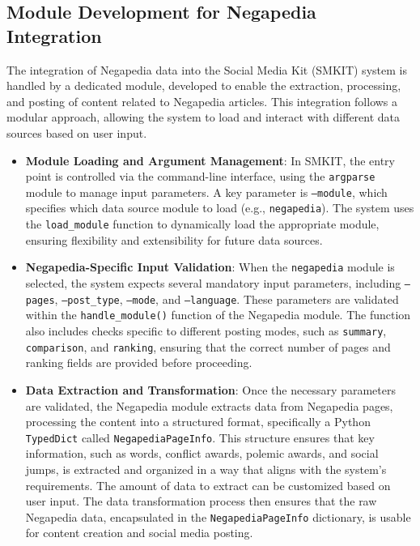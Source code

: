 \subsection{Module Development for Negapedia Integration}
\label{subsec:module_development_for_negapedia_integration}
The integration of Negapedia data into the Social Media Kit (SMKIT) system is handled by a dedicated module, developed to enable the extraction, processing, and posting of content related to Negapedia articles. This integration follows a modular approach, allowing the system to load and interact with different data sources based on user input.

\begin{itemize}
    \item \textbf{Module Loading and Argument Management}: In SMKIT, the entry point is controlled via the command-line interface, using the \texttt{argparse} module to manage input parameters. A key parameter is \texttt{--module}, which specifies which data source module to load (e.g., \texttt{negapedia}). The system uses the \texttt{load\_module} function to dynamically load the appropriate module, ensuring flexibility and extensibility for future data sources.
    
    \item \textbf{Negapedia-Specific Input Validation}: When the \texttt{negapedia} module is selected, the system expects several mandatory input parameters, including \texttt{--pages}, \texttt{--post\_type}, \texttt{--mode}, and \texttt{--language}. These parameters are validated within the \texttt{handle\_module()} function of the Negapedia module. The function also includes checks specific to different posting modes, such as \texttt{summary}, \texttt{comparison}, and \texttt{ranking}, ensuring that the correct number of pages and ranking fields are provided before proceeding.

    \item \textbf{Data Extraction and Transformation}: Once the necessary parameters are validated, the Negapedia module extracts data from Negapedia pages, processing the content into a structured format, specifically a Python \texttt{TypedDict} called \texttt{NegapediaPageInfo}. This structure ensures that key information, such as words, conflict awards, polemic awards, and social jumps, is extracted and organized in a way that aligns with the system’s requirements. The amount of data to extract can be customized based on user input. The data transformation process then ensures that the raw Negapedia data, encapsulated in the \texttt{NegapediaPageInfo} dictionary, is usable for content creation and social media posting.
    

\end{itemize}
